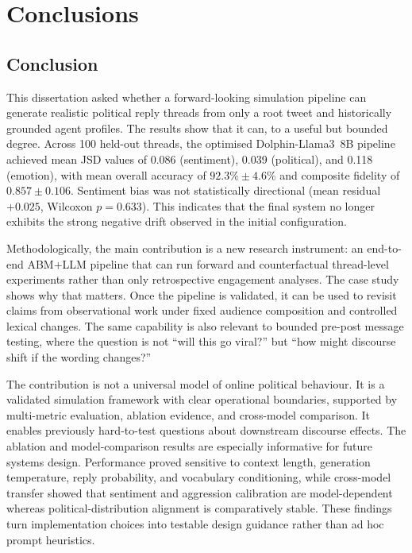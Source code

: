 \documentclass[logo,bsc,singlespacing,parskip,online]{infthesis}
\begin{document}
\chapter{Conclusions}

\section{Conclusion}
This dissertation asked whether a forward-looking simulation pipeline can generate realistic political reply threads from only a root tweet and historically grounded agent profiles. The results show that it can, to a useful but bounded degree. Across 100 held-out threads, the optimised Dolphin-Llama3~8B pipeline achieved mean JSD values of 0.086 (sentiment), 0.039 (political), and 0.118 (emotion), with mean overall accuracy of $92.3\% \pm 4.6\%$ and composite fidelity of $0.857 \pm 0.106$. Sentiment bias was not statistically directional (mean residual $+0.025$, Wilcoxon $p = 0.633$). This indicates that the final system no longer exhibits the strong negative drift observed in the initial configuration.

Methodologically, the main contribution is a new research instrument: an end-to-end ABM+LLM pipeline that can run forward and counterfactual thread-level experiments rather than only retrospective engagement analyses. The case study shows why that matters. Once the pipeline is validated, it can be used to revisit claims from observational work under fixed audience composition and controlled lexical changes. The same capability is also relevant to bounded pre-post message testing, where the question is not ``will this go viral?'' but ``how might discourse shift if the wording changes?''

The contribution is not a universal model of online political behaviour. It is a validated simulation framework with clear operational boundaries, supported by multi-metric evaluation, ablation evidence, and cross-model comparison. It enables previously hard-to-test questions about downstream discourse effects. The ablation and model-comparison results are especially informative for future systems design. Performance proved sensitive to context length, generation temperature, reply probability, and vocabulary conditioning, while cross-model transfer showed that sentiment and aggression calibration are model-dependent whereas political-distribution alignment is comparatively stable. These findings turn implementation choices into testable design guidance rather than ad hoc prompt heuristics.
\end{document}
